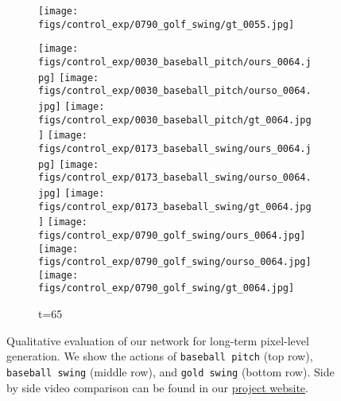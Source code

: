 \documentclass{article}
\begin{document}
\begin{appendix}
\begin{figure*}[!thbp]
\begin{subfigure}{0.12\linewidth}
  		\texttt{[image: figs/control\_exp/0790\_golf\_swing/gt\_0055.jpg]}
	\end{subfigure}
	\begin{subfigure}{0.12\linewidth}
        \caption*{t=65}
        \vspace{-7pt}
	    \texttt{[image: figs/control\_exp/0030\_baseball\_pitch/ours\_0064.jpg]}
	    \texttt{[image: figs/control\_exp/0030\_baseball\_pitch/ourso\_0064.jpg]}
	    \vspace{.2cm}
  		\texttt{[image: figs/control\_exp/0030\_baseball\_pitch/gt\_0064.jpg]}
  		\texttt{[image: figs/control\_exp/0173\_baseball\_swing/ours\_0064.jpg]}
  		\texttt{[image: figs/control\_exp/0173\_baseball\_swing/ourso\_0064.jpg]}
  		\vspace{.2cm}
  		\texttt{[image: figs/control\_exp/0173\_baseball\_swing/gt\_0064.jpg]}
  		\texttt{[image: figs/control\_exp/0790\_golf\_swing/ours\_0064.jpg]}
  		\texttt{[image: figs/control\_exp/0790\_golf\_swing/ourso\_0064.jpg]}
  		\vspace{.2cm}
  		\texttt{[image: figs/control\_exp/0790\_golf\_swing/gt\_0064.jpg]}
	\end{subfigure}
    \caption{Qualitative evaluation of our network for long-term pixel-level generation. We show the actions of \texttt{baseball pitch} (top row), \texttt{baseball swing} (middle row), and \texttt{gold swing} (bottom row). Side by side video comparison can be found in our \href{https://goo.gl/U7UOfy}{project website}.}
\label{fig:penngtft}
\vspace{-40pt}
\end{figure*}
\clearpage


\end{appendix}
\end{document}
